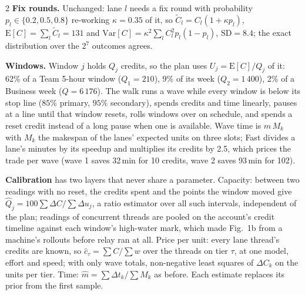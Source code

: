 \documentclass[9pt,a4paper]{extarticle}
\newcommand{\para}[1]{\textsf{\textbf{#1}}\enspace}
\begin{document}
\begin{multicols}{2}
\para{Fix rounds.} Unchanged: lane $l$ needs a fix round with probability $p_l\in\{0.2,0.5,0.8\}$ re-working $\kappa=0.35$ of it, so $\tilde C_l=C_l(1+\kappa p_l)$, $\mathrm{E}[C]=\sum_l\tilde C_l=131$ and $\mathrm{Var}[C]=\kappa^2\sum_l C_l^2p_l(1-p_l)$, $\mathrm{SD}=8.4$; the exact distribution over the $2^7$ outcomes agrees.

\para{Windows.} Window $j$ holds $Q_j$ credits, so the plan uses $U_j=\mathrm{E}[C]/Q_j$ of it: 62\% of a Team 5-hour window ($Q_1=210$), 9\% of its week ($Q_2=1\,400$), 2\% of a Business week ($Q=6\,176$). The walk runs a wave while every window is below its stop line ($85\%$ primary, $95\%$ secondary), spends credits and time linearly, pauses at a line until that window resets, rolls windows over on schedule, and spends a reset credit instead of a long pause when one is available. Wave time is $m\,M_k$ with $M_k$ the makespan of the lanes' expected units on three slots; Fast divides a lane's minutes by its speedup and multiplies its credits by 2.5, which prices the trade per wave (wave 1 saves 32\,min for 10 credits, wave 2 saves 93\,min for 102).

\para{Calibration} has two layers that never share a parameter. Capacity: between two readings with no reset, the credits spent and the points the window moved give $\hat Q_j=100\sum\Delta C/\sum\Delta u_j$, a ratio estimator over all such intervals, independent of the plan; readings of concurrent threads are pooled on the account's credit timeline against each window's high-water mark, which made Fig.~1b from a machine's rollouts before relay ran at all. Price per unit: every lane thread's credits are known, so $\hat c_\tau=\sum C/\sum w$ over the threads on tier $\tau$, at one model, effort and speed; with only wave totals, non-negative least squares of $\Delta C_k$ on the units per tier. Time: $\hat m=\sum\Delta t_k/\sum M_k$ as before. Each estimate replaces its prior from the first sample.


\end{multicols}
\end{document}

